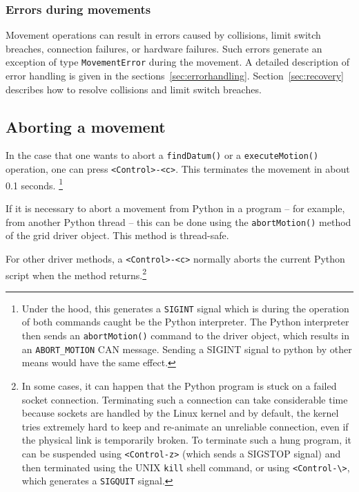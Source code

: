 \documentclass[11pt,a4paper]{scrartcl}
\begin{document}
\subsubsection{Errors during movements}
Movement operations can result in errors caused by collisions, limit
switch breaches, connection failures, or hardware failures. Such
errors generate an exception of type \texttt{MovementError} during the
movement. A detailed description of error handling is given in the
sections~\ref{sec:errorhandling}. Section~\ref{sec:recovery} describes
how to resolve collisions and limit switch breaches.





\subsection{Aborting a movement}
  In the case
that one wants to abort a \texttt{findDatum()} or a
\texttt{executeMotion()} operation, one can press
\verb+<Control>-<c>+. This terminates the movement in about 0.1
seconds. \footnote{Under the hood, this generates a \texttt{SIGINT}
  signal which is during the operation of both commands caught be the
  Python interpreter. The Python interpreter then sends an
  \texttt{abortMotion()} command to the driver object, which results
  in an \texttt{ABORT\_MOTION} CAN message. Sending a SIGINT signal to
  python by other means would have the same effect.}

If it is necessary to abort a movement from Python in a program -- for
example, from another Python thread -- this can be done using the
\texttt{abortMotion()} method of the grid driver object.  This method
is thread-safe.

For other driver methods, a \verb+<Control>-<c>+ normally aborts the
current Python script when the method returns.\footnote{
  In some cases, it
  can happen that the Python program is stuck on a failed socket
  connection. Terminating such a connection can take considerable time
  because sockets are handled by the Linux kernel and by default, the
  kernel tries extremely hard to keep and re-animate an unreliable
  connection, even if the physical link is temporarily broken. To
  terminate such a hung program, it can be suspended using
  \texttt{<Control-z>} (which sends a SIGSTOP signal) and then
  terminated using the UNIX \texttt{kill} shell command, or using
  \texttt{<Control-\textbackslash>}, which generates a
  \texttt{SIGQUIT} signal.}
\end{document}
